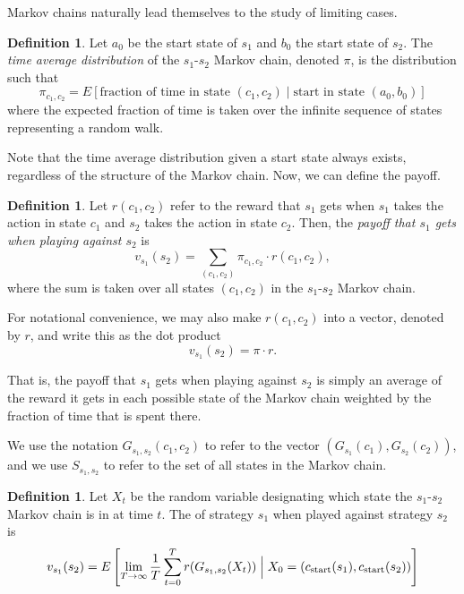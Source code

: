 \documentclass[11pt]{amsart}
\theoremstyle{definition}
\newtheorem{definition}[theorem]{Definition}
\theoremstyle{remark}
\begin{document}
Markov chains naturally lead themselves to the study of limiting cases.

\begin{definition}
  \label{timeaveragedistribution}
  Let $a_0$ be the start state of $s_1$ and $b_0$ the start state of $s_2$. The \textit{time average distribution} of the $s_1$-$s_2$ Markov chain, denoted $\pi$, is the distribution such that \begin{equation*}
    \pi_{c_1, c_2} = E \left[ \text{fraction of time in state $(c_1,c_2)$} \mid \text{start in state } (a_0, b_0)  \right]
  \end{equation*}
  where the expected fraction of time is taken over the infinite sequence of states representing a random walk.
\end{definition}

Note that the time average distribution given a start state always exists, regardless of the structure of the Markov chain. Now, we can define the payoff.

\begin{definition}
  \label{payofftimeaverage}
  Let $r(c_1, c_2)$ refer to the reward that $s_1$ gets when $s_1$ takes the action in state $c_1$ and $s_2$ takes the action in state $c_2$. Then, the \textit{payoff that $s_1$ gets when playing against $s_2$} is
  \begin{equation*}
    v_{s_1}(s_2) = \sum_{(c_1,c_2)} \pi_{c_1,c_2} \cdot r(c_1, c_2),
  \end{equation*}
  where the sum is taken over all states $(c_1,c_2)$ in the $s_1$-$s_2$ Markov chain.
\end{definition}

For notational convenience, we may also make $r(c_1, c_2)$ into a vector, denoted by $r$, and write this as the dot product \begin{equation*}
  v_{s_1}(s_2) = \pi \cdot r.
\end{equation*}

That is, the payoff that $s_1$ gets when playing against $s_2$ is simply an average of the reward it gets in each possible state of the Markov chain weighted by the fraction of time that is spent there.

\iffalse
We use the notation $G_{s_1,s_2}(c_1,c_2)$ to refer to the vector $(G_{s_1}(c_1), G_{s_2}(c_2))$, and we use $S_{s_1,s_2}$ to refer to the set of all states in the Markov chain.

\begin{definition}
  \label{strategypayoffs}
  Let $X_t$ be the random variable designating which state the $s_1$-$s_2$ Markov chain is in at time $t$. The  of strategy $s_1$ when played against strategy $s_2$ is 
  \begin{equation*}
    v_{s_1}(s_2) = E \left[ \lim_{T \to \infty} \frac{1}{T} \sum_{t=0}^T r(G_{s_1,s_2} (X_t)) \Bigm| X_0 = (c_{\text{start}}(s_1), c_{\text{start}}(s_2)) \right]
  \end{equation*}
\end{definition}
\end{document}
